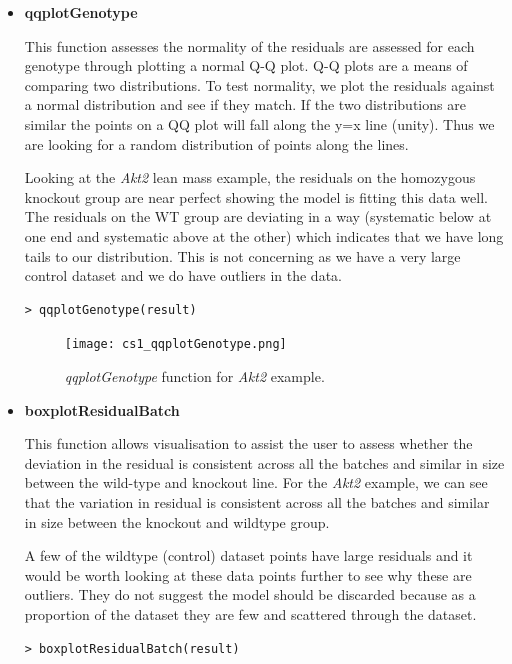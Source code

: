 \documentclass[12pt,a4paper]{article}
\begin{document}
\begin{itemize}
 \item \textbf{qqplotGenotype} 
 
This function assesses the normality of the residuals are assessed for each genotype through plotting a normal Q-Q plot. 
Q-Q plots are a means of comparing two distributions. To test normality, we plot the residuals against a normal distribution and see if they match. 
If the two distributions are similar the points on a QQ plot will fall along the y=x line (unity). Thus we are looking for a random distribution of points along the lines.  

Looking at the \textit{Akt2} lean mass example, the residuals on the homozygous knockout group are near perfect showing the model is fitting this data well.  
The residuals on the WT group are deviating in a way (systematic below at one end and systematic above at the other) which indicates that we have long tails to our distribution. 
This is not concerning as we have a very large control dataset and we do have outliers in the data.  

\begingroup
    \fontsize{8pt}{12pt}\selectfont
\begin{verbatim}
> qqplotGenotype(result)
\end{verbatim}
\endgroup 

\begin{figure}[H]%
\centerline{\texttt{[image: cs1\_qqplotGenotype.png]}}
\caption{\textit{qqplotGenotype} function for \textit{Akt2} example.}\label{fig:17}
\end{figure}

\item \textbf{boxplotResidualBatch} 

This function allows visualisation to assist the user to assess whether the deviation in the residual is consistent across all the batches and similar in size between the wild-type and knockout line. 
For the \textit{Akt2} example, we can see that the variation in residual is consistent across all the batches and similar in size between the knockout and wildtype group.

A few of the wildtype (control) dataset points have large residuals and it would be worth looking at these data points further to see why these are outliers. They do not suggest the model should be discarded because as a proportion of the dataset they are few and scattered through the dataset.

\begingroup
    \fontsize{8pt}{12pt}\selectfont
\begin{verbatim}
> boxplotResidualBatch(result)
\end{verbatim}
\endgroup 


\end{itemize}
\end{document}
